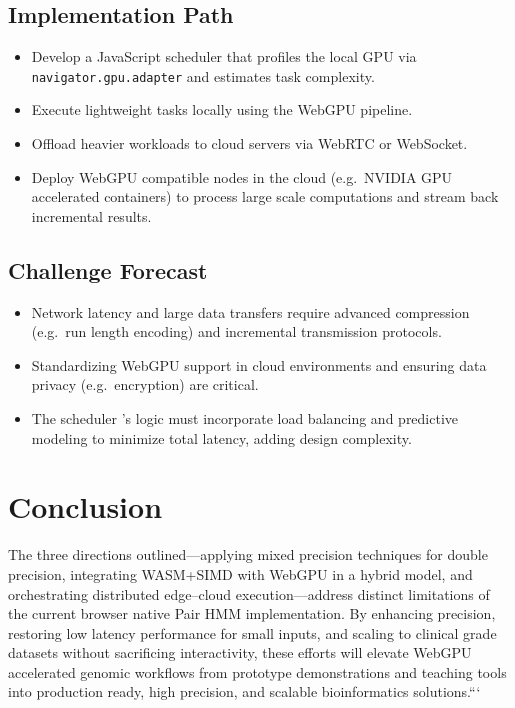 \documentclass[PhD]{PHlab-thesis}
\begin{document}
\subsection*{Implementation Path}
\begin{itemize}
  \item Develop a JavaScript scheduler that profiles the local GPU via \texttt{navigator.gpu.adapter} and estimates task complexity.
  \item Execute lightweight tasks locally using the WebGPU pipeline.
  \item Offload heavier workloads to cloud servers via WebRTC or WebSocket.
  \item Deploy WebGPU compatible nodes in the cloud (e.g.\ NVIDIA GPU accelerated containers) to process large scale computations and stream back incremental results.
\end{itemize}

\subsection*{Challenge Forecast}
\begin{itemize}
  \item Network latency and large data transfers require advanced compression (e.g.\ run length encoding) and incremental transmission protocols.
  \item Standardizing WebGPU support in cloud environments and ensuring data privacy (e.g.\ encryption) are critical.
  \item The scheduler 's logic must incorporate load balancing and predictive modeling to minimize total latency, adding design complexity.
\end{itemize}

\section*{Conclusion}

The three directions outlined—applying mixed precision techniques for double precision, integrating WASM+SIMD with WebGPU in a hybrid model, and orchestrating distributed edge–cloud execution—address distinct limitations of the current browser native Pair HMM implementation. By enhancing precision, restoring low latency performance for small inputs, and scaling to clinical grade datasets without sacrificing interactivity, these efforts will elevate WebGPU accelerated genomic workflows from prototype demonstrations and teaching tools into production ready, high precision, and scalable bioinformatics solutions.```
\end{document}
